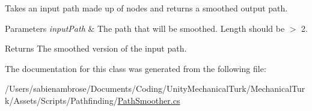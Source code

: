 Takes an input path made up of nodes and returns a smoothed output path. 


\begin{DoxyParams}{Parameters}
{\em input\+Path} & The path that will be smoothed. Length should be $>$ 2. \\
\hline
\end{DoxyParams}
\begin{DoxyReturn}{Returns}
The smoothed version of the input path. 
\end{DoxyReturn}


The documentation for this class was generated from the following file\+:\begin{DoxyCompactItemize}
\item 
/\+Users/sabienambrose/\+Documents/\+Coding/\+Unity\+Mechanical\+Turk/\+Mechanical\+Turk/\+Assets/\+Scripts/\+Pathfinding/\mbox{\hyperlink{_path_smoother_8cs}{Path\+Smoother.\+cs}}\end{DoxyCompactItemize}
